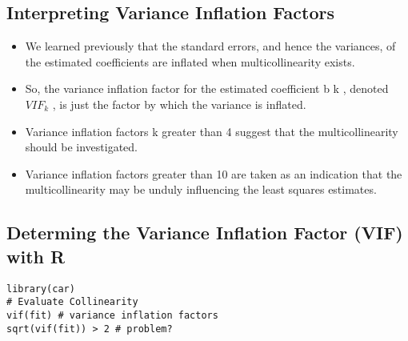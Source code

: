 \documentclass[a4paper,12pt]{article}
\begin{document}



\subsection{Interpreting Variance Inflation Factors}
\begin{itemize}
	\item We learned previously that the standard errors, and hence the variances, of the estimated
	coefficients are inflated when multicollinearity exists.
	
	
	\item So, the variance inflation factor for the estimated coefficient b k , denoted $VIF_k$ , is just the
	factor by which the variance is inflated.
	\item Variance inflation factors k greater than 4 suggest that the multicollinearity should be
	investigated.
	\item Variance inflation factors greater than 10 are taken as an indication that the multicollinearity may be unduly influencing the least squares estimates.
\end{itemize}








\newpage
\subsection{Determing the Variance Inflation Factor (VIF) with R}
\begin{verbatim}
library(car)
# Evaluate Collinearity
vif(fit) # variance inflation factors
sqrt(vif(fit)) > 2 # problem?
\end{verbatim}
%
%
\end{document}
